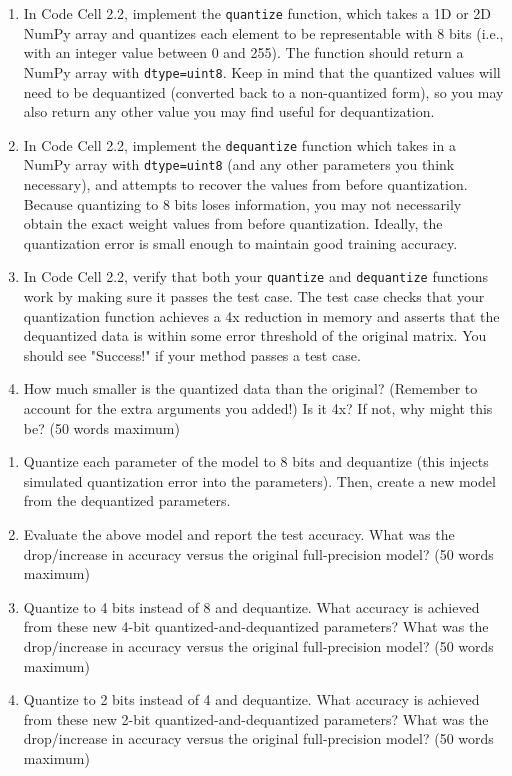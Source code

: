 \documentclass[a4 paper]{article}
\newcommand{\pya}[1]{\texttt{#1}}
\begin{document}
\solution{}


\newpage
{}
\begin{enumerate}
    \item In Code Cell 2.2, implement the \pya{quantize} function, which takes a 1D or 2D NumPy array and quantizes each element to be representable with 8 bits (i.e., with an integer value between 0 and 255). The function should return a NumPy array with \pya{dtype=uint8}. Keep in mind that the quantized values will need to be dequantized (converted back to a non-quantized form), so you may also return any other value you may find useful for dequantization.
    \item In Code Cell 2.2, implement the \pya{dequantize} function which takes in a NumPy array with \pya{dtype=uint8} (and any other parameters you think necessary), and attempts to recover the values from before quantization. Because quantizing to 8 bits loses information, you may not necessarily obtain the exact weight values from before quantization. Ideally, the quantization error is small enough to maintain good training accuracy.
    \item In Code Cell 2.2, verify that both your \pya{quantize} and \pya{dequantize} functions work by making sure it passes the test case. The test case checks that your quantization function achieves a 4x reduction in memory and asserts that the dequantized data is within some error threshold of the original matrix. You should see "Success!" if your method passes a test case.
    \item How much smaller is the quantized data than the original? (Remember to account for the extra arguments you added!) Is it 4x? If not, why might this be? (50 words maximum)
\end{enumerate}

\solution{}



\begin{enumerate}
    \item Quantize each parameter of the model to 8 bits and dequantize (this injects simulated quantization error into the parameters). Then, create a new model from the dequantized parameters.
    \item Evaluate the above model and report the test accuracy. What was the drop/increase in accuracy versus the original full-precision model? (50 words maximum) 
    \item Quantize to 4 bits instead of 8 and dequantize. What accuracy is achieved from these new 4-bit quantized-and-dequantized parameters? What was the drop/increase in accuracy versus the original full-precision model? (50 words maximum)
    \item Quantize to 2 bits instead of 4 and dequantize. What accuracy is achieved from these new 2-bit quantized-and-dequantized parameters? What was the drop/increase in accuracy versus the original full-precision model? (50 words maximum)
\end{enumerate}
\end{document}
